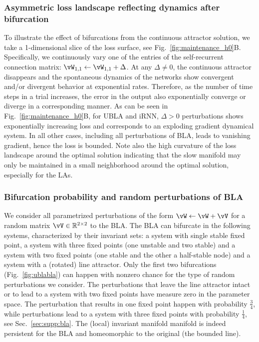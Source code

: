 \documentclass{article} %
\newcounter{ct}
\theoremstyle{definition}
\theoremstyle{remark}
\begin{document}
\subsubsection{Asymmetric loss landscape reflecting dynamics after bifurcation}\label{sec:asymmetricloss}
To illustrate the effect of bifurcations from the continuous attractor solution, we take a 1-dimensional slice of the loss surface, see Fig.~\ref{fig:maintenance_h0}B.
Specifically, we continuously vary one of the entries of the self-recurrent connection matrix: $    \vW_{1,1} \leftarrow \vW_{1,1} + \Delta$. %
At any $\Delta \neq 0$, the continuous attractor disappears and the spontaneous dynamics of the networks show convergent and/or divergent behavior at exponential rates.
Therefore, as the number of time steps in a trial increases, the error in the output also exponentially converge or diverge in a corresponding manner.
As can be seen in Fig.~\ref{fig:maintenance_h0}B, for UBLA and iRNN, $\Delta > 0$  perturbations shows exponentially increasing loss and corresponds to an exploding gradient dynamical system.
In all other cases, including all perturbations of BLA, leads to vanishing gradient, hence the loss is bounded.
Note also the high curvature of the loss landscape around the optimal solution indicating that the slow manifold may only be maintained in a small neighborhood around the optimal solution, especially for the LAs.

\subsubsection{Bifurcation probability and random perturbations of BLA}
We consider all parametrized perturbations of the form $ \vW \leftarrow \vW + \vV$ for a random matrix $\vV\in \mathbb{R}^{2\times 2}$ to the BLA.
The BLA can bifurcate in the following systems, characterized by their invariant sets: a system with single stable fixed point, a system with three fixed points (one unstable and two stable) and  a system with two fixed points (one stable and the other a half-stable node) and a system with a (rotated) line attractor. 
Only the first two bifurcations (Fig.~\ref{fig:ublabla}) can happen with nonzero chance for the type of random perturbations we consider.
The perturbations that leave the line attractor intact or to lead to a system with two fixed points have measure zero in the parameter space.
The perturbation that results in one fixed point happen with probability $\frac{3}{4}$, while perturbations lead to a system with three fixed points with probability $\frac{1}{4}$, see Sec.~\ref{sec:supp:bla}.
The (local) %
 invariant manifold manifold is indeed persistent for the BLA and homeomorphic to the original (the bounded line).
\end{document}
